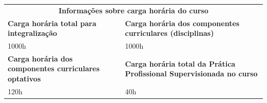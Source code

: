 \documentclass[
	12pt,				%
	openright,			%
	twoside,			%
	a4paper,			%
	chapter=TITLE,		%
	english,			%
	french,				%
	spanish,			%
	brazil,				%
	]{abntex2}
\begin{document}
\begin{tabularx}{\linewidth}{X X}
	\multicolumn{2}{c}{\cellcolor{gray!10}\textbf{Informações sobre carga horária do curso}} \\
	
	\cellcolor{gray!10}\textbf{Carga horária total para integralização} &
	\cellcolor{gray!10}\textbf{Carga horária dos componentes curriculares (disciplinas)} \\
	
	1000h & 1000h\\
	
	\cellcolor{gray!10}\textbf{Carga horária dos componentes curriculares optativos} &
	\cellcolor{gray!10}\textbf{Carga horária total da Prática Profissional Supervisionada no curso} \\
	
	120h & 40h\\
	
	 
\end{tabularx}
\end{document}
